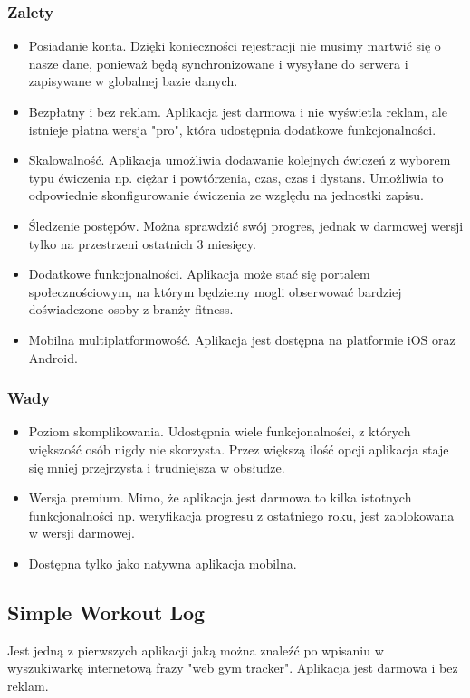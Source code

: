 \documentclass{article}
\begin{document}
            \subsubsection*{Zalety}
            \begin{itemize}
                  \item Posiadanie konta. Dzięki konieczności rejestracji nie musimy martwić się o nasze dane, ponieważ będą synchronizowane i wysyłane do serwera i zapisywane w globalnej bazie danych.
                  \item Bezpłatny i bez reklam. Aplikacja jest darmowa i nie wyświetla reklam, ale istnieje płatna wersja "pro", która udostępnia dodatkowe funkcjonalności. 
                  \item Skalowalność. Aplikacja umożliwia dodawanie kolejnych ćwiczeń z wyborem typu ćwiczenia np. ciężar i powtórzenia, czas, czas i dystans. Umożliwia to odpowiednie skonfigurowanie ćwiczenia ze względu na jednostki zapisu. 
                  \item Śledzenie postępów. Można sprawdzić swój progres, jednak w darmowej wersji tylko na przestrzeni ostatnich 3 miesięcy.
                  \item Dodatkowe funkcjonalności. Aplikacja może stać się portalem społecznościowym, na którym będziemy mogli obserwować bardziej doświadczone osoby z branży fitness.
                  \item Mobilna multiplatformowość. Aplikacja jest dostępna na platformie iOS oraz Android.
            \end{itemize}
            \subsubsection*{Wady}
            \begin{itemize}
                  \item Poziom skomplikowania. Udostępnia wiele funkcjonalności, z których większość osób nigdy nie skorzysta. Przez większą ilość opcji aplikacja staje się mniej przejrzysta i trudniejsza w obsłudze.
                  \item Wersja premium. Mimo, że aplikacja jest darmowa to kilka istotnych funkcjonalności np. weryfikacja progresu z ostatniego roku, jest zablokowana w wersji darmowej.
                  \item Dostępna tylko jako natywna aplikacja mobilna.
            \end{itemize}
      \subsection{Simple Workout Log}
            Jest jedną z pierwszych aplikacji jaką można znaleźć po wpisaniu w wyszukiwarkę internetową frazy "web gym tracker". Aplikacja jest darmowa i bez reklam.
\end{document}
